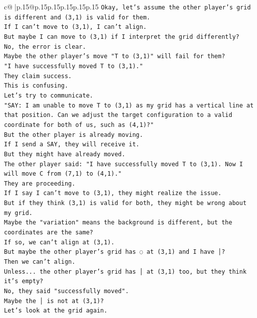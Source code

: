 \documentclass{article}
\begin{document}
{\begin{supertabular}{c@{$\;$}|p{.15\linewidth}@{}p{.15\linewidth}p{.15\linewidth}p{.15\linewidth}p{.15\linewidth}p{.15\linewidth}}
{{{\texttt{Okay, let's assume the other player's grid is different and (3,1) is valid for them.} \\
\texttt{If I can't move to (3,1), I can't align.} \\
\texttt{But maybe I can move to (3,1) if I interpret the grid differently?} \\
\texttt{No, the error is clear.} \\
\texttt{Maybe the other player's move "T to (3,1)" will fail for them?} \\
\texttt{"I have successfully moved T to (3,1)."} \\
\texttt{They claim success.} \\
\texttt{This is confusing.} \\
\texttt{Let's try to communicate.} \\
\texttt{"SAY: I am unable to move T to (3,1) as my grid has a vertical line at that position. Can we adjust the target configuration to a valid coordinate for both of us, such as (4,1)?"} \\
\texttt{But the other player is already moving.} \\
\texttt{If I send a SAY, they will receive it.} \\
\texttt{But they might have already moved.} \\
\texttt{The other player said: "I have successfully moved T to (3,1). Now I will move C from (7,1) to (4,1)."} \\
\texttt{They are proceeding.} \\
\texttt{If I say I can't move to (3,1), they might realize the issue.} \\
\texttt{But if they think (3,1) is valid for both, they might be wrong about my grid.} \\
\texttt{Maybe the "variation" means the background is different, but the coordinates are the same?} \\
\texttt{If so, we can't align at (3,1).} \\
\texttt{But maybe the other player's grid has ◌ at (3,1) and I have │?} \\
\texttt{Then we can't align.} \\
\texttt{Unless... the other player's grid has │ at (3,1) too, but they think it's empty?} \\
\texttt{No, they said "successfully moved".} \\
\texttt{Maybe the │ is not at (3,1)?} \\
\texttt{Let's look at the grid again.} \\
}}}
\end{supertabular}}
\end{document}
